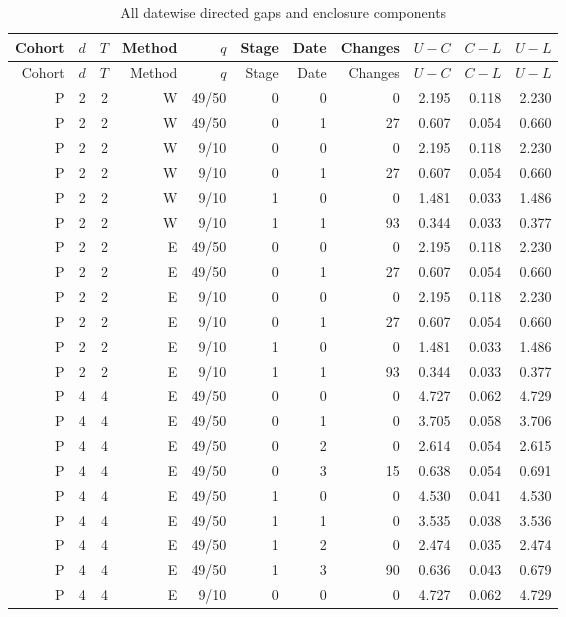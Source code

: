 \begingroup\small\setlength{\tabcolsep}{3pt}
\begin{longtable}{rrrrrrrrrrr}
\caption{All datewise directed gaps and enclosure components}\label{tab:all-gaps56}\\
\toprule
Cohort & $d$ & $T$ & Method & $q$ & Stage & Date & Changes & $U-C$ & $C-L$ & $U-L$ \\
\midrule\endfirsthead
\toprule
Cohort & $d$ & $T$ & Method & $q$ & Stage & Date & Changes & $U-C$ & $C-L$ & $U-L$ \\
\midrule\endhead
P & 2 & 2 & W & 49/50 & 0 & 0 & 0 & 2.195 & 0.118 & 2.230 \\
P & 2 & 2 & W & 49/50 & 0 & 1 & 27 & 0.607 & 0.054 & 0.660 \\
P & 2 & 2 & W & 9/10 & 0 & 0 & 0 & 2.195 & 0.118 & 2.230 \\
P & 2 & 2 & W & 9/10 & 0 & 1 & 27 & 0.607 & 0.054 & 0.660 \\
P & 2 & 2 & W & 9/10 & 1 & 0 & 0 & 1.481 & 0.033 & 1.486 \\
P & 2 & 2 & W & 9/10 & 1 & 1 & 93 & 0.344 & 0.033 & 0.377 \\
P & 2 & 2 & E & 49/50 & 0 & 0 & 0 & 2.195 & 0.118 & 2.230 \\
P & 2 & 2 & E & 49/50 & 0 & 1 & 27 & 0.607 & 0.054 & 0.660 \\
P & 2 & 2 & E & 9/10 & 0 & 0 & 0 & 2.195 & 0.118 & 2.230 \\
P & 2 & 2 & E & 9/10 & 0 & 1 & 27 & 0.607 & 0.054 & 0.660 \\
P & 2 & 2 & E & 9/10 & 1 & 0 & 0 & 1.481 & 0.033 & 1.486 \\
P & 2 & 2 & E & 9/10 & 1 & 1 & 93 & 0.344 & 0.033 & 0.377 \\
P & 4 & 4 & E & 49/50 & 0 & 0 & 0 & 4.727 & 0.062 & 4.729 \\
P & 4 & 4 & E & 49/50 & 0 & 1 & 0 & 3.705 & 0.058 & 3.706 \\
P & 4 & 4 & E & 49/50 & 0 & 2 & 0 & 2.614 & 0.054 & 2.615 \\
P & 4 & 4 & E & 49/50 & 0 & 3 & 15 & 0.638 & 0.054 & 0.691 \\
P & 4 & 4 & E & 49/50 & 1 & 0 & 0 & 4.530 & 0.041 & 4.530 \\
P & 4 & 4 & E & 49/50 & 1 & 1 & 0 & 3.535 & 0.038 & 3.536 \\
P & 4 & 4 & E & 49/50 & 1 & 2 & 0 & 2.474 & 0.035 & 2.474 \\
P & 4 & 4 & E & 49/50 & 1 & 3 & 90 & 0.636 & 0.043 & 0.679 \\
P & 4 & 4 & E & 9/10 & 0 & 0 & 0 & 4.727 & 0.062 & 4.729 \\

\end{longtable}
